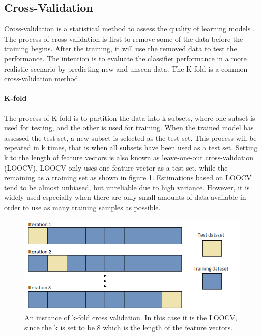\documentclass[USenglish]{ifimaster}  %
\begin{document}
\subsection{Cross-Validation} \label{sub:cv}
Cross-validation is a statistical method to assess the quality of learning models \cite{Refaeilzadeh2009}. The process of cross-validation is first to remove some of the data before the training begins. After the training, it will use the removed data to test the performance. The intention is to evaluate the classifier performance in a more realistic scenario by predicting new and unseen data. The K-fold is a common cross-validation method.
	
\paragraph{K-fold}
The process of K-fold is to partition the data into k subsets, where one subset is used for testing, and the other is used for training. When the trained model has assessed the test set, a new subset is selected as the test set. This process will be repeated in k times, that is when all subsets have been used as a test set. Setting k to the length of feature vectors is also known as leave-one-out cross-validation (LOOCV). LOOCV only uses one feature vector as a test set, while the remaining as a training set as shown in figure \ref{fig:kfold}. Estimations based on LOOCV tend to be almost unbiased, but unreliable due to high variance. However, it is widely used especially when there are only small amounts of data available in order to use as many training samples as possible.


 	
	\begin{figure}[h]
		\centering
		\includegraphics[scale=0.6]{Figures/Kfold}
		\caption[K-fold cross validation]{An instance of k-fold cross validation. In this case it is the LOOCV, since the k is set to be 8 which is the length of the feature vectors.}
		\label{fig:kfold}
	\end{figure}
	
\end{document}
